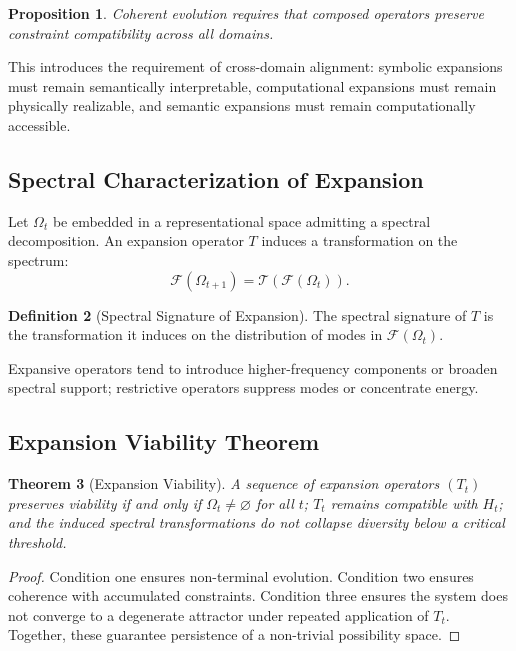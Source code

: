 \documentclass[12pt, a4paper]{article}
\theoremstyle{plain}
\newtheorem{theorem}{Theorem}[section]
\newtheorem{proposition}[theorem]{Proposition}
\theoremstyle{definition}
\newtheorem{definition}[theorem]{Definition}
\theoremstyle{remark}
\begin{document}
\begin{proposition}
Coherent evolution requires that composed operators preserve constraint compatibility across all domains.
\end{proposition}

This introduces the requirement of cross-domain alignment: symbolic expansions must remain semantically interpretable, computational expansions must remain physically realizable, and semantic expansions must remain computationally accessible.

\subsection{Spectral Characterization of Expansion}

Let $\Omega_t$ be embedded in a representational space admitting a spectral decomposition. An expansion operator $T$ induces a transformation on the spectrum:
\[
\mathcal{F}(\Omega_{t+1}) = \mathcal{T}(\mathcal{F}(\Omega_t)).
\]

\begin{definition}[Spectral Signature of Expansion]
The spectral signature of $T$ is the transformation it induces on the distribution of modes in $\mathcal{F}(\Omega_t)$.
\end{definition}

Expansive operators tend to introduce higher-frequency components or broaden spectral support; restrictive operators suppress modes or concentrate energy.

\subsection{Expansion Viability Theorem}

\begin{theorem}[Expansion Viability]
A sequence of expansion operators $(T_t)$ preserves viability if and only if $\Omega_t \neq \varnothing$ for all $t$; $T_t$ remains compatible with $H_t$; and the induced spectral transformations do not collapse diversity below a critical threshold.
\end{theorem}

\begin{proof}
Condition one ensures non-terminal evolution. Condition two ensures coherence with accumulated constraints. Condition three ensures the system does not converge to a degenerate attractor under repeated application of $T_t$. Together, these guarantee persistence of a non-trivial possibility space.
\end{proof}
\end{document}
